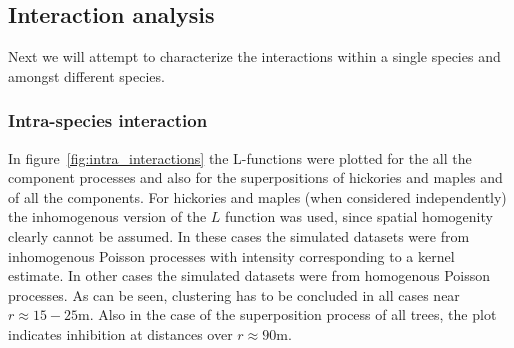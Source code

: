 \documentclass[12pt,a4paper,oneside,article]{memoir}
\begin{document}
\subsection{Interaction analysis}

Next we will attempt to characterize the interactions within a single species
and amongst different species.

\subsubsection{Intra-species interaction}

In figure~\ref{fig:intra_interactions} the L-functions were
plotted for the all the component processes and also for the superpositions
of hickories and maples and of all the components. For hickories and maples
(when considered independently) the inhomogenous version of the $L$ function was
used, since spatial homogenity clearly cannot be assumed. In these cases the simulated
datasets were from inhomogenous Poisson processes with intensity corresponding to
a kernel estimate. In other cases the simulated datasets were from homogenous Poisson processes.
As can be seen, clustering has to be concluded in all cases near $r\approx 15-25$m. Also in 
the case of the superposition process of all trees, the plot indicates inhibition at distances
over $r\approx 90$m.
\end{document}
